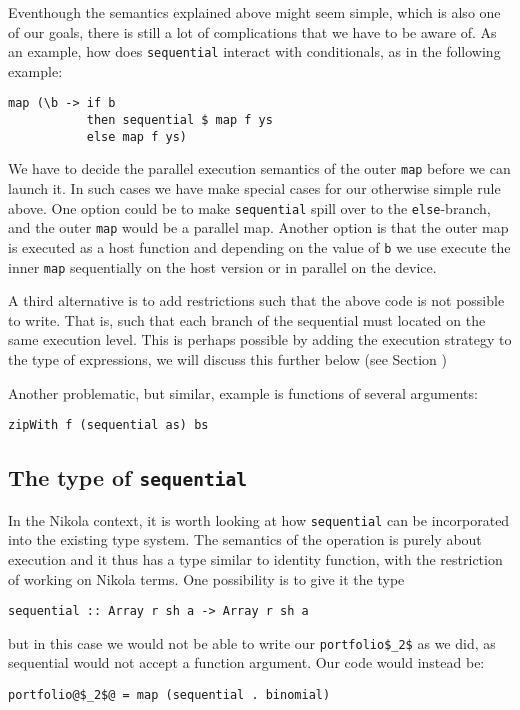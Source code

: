 Eventhough the semantics explained above might seem simple, which is
also one of our goals, there is still a lot of complications that we
have to be aware of. As an example, how does \lstinline{sequential}
interact with conditionals, as in the following example:
\begin{lstlisting}
map (\b -> if b 
           then sequential $ map f ys 
           else map f ys)
\end{lstlisting}
We have to decide the parallel execution semantics of the outer
\lstinline{map} before we can launch it. In such cases we have make
special cases for our otherwise simple rule above. One option could be
to make \lstinline{sequential} spill over to the
\lstinline{else}-branch, and the outer \lstinline{map} would be a
parallel map. Another option is that the outer map is executed as a
host function and depending on the value of \lstinline{b} we use
execute the inner \lstinline{map} sequentially on the host version or
in parallel on the device.

A third alternative is to add restrictions such that the above code is
not possible to write. That is, such that each branch of the
sequential must located on the same execution level. This is perhaps
possible by adding the execution strategy to the type of expressions,
we will discuss this further below (see Section )

Another problematic, but similar, example is functions of several arguments:
\begin{lstlisting}
zipWith f (sequential as) bs
\end{lstlisting}

\subsection{The type of \texttt{sequential}}
In the Nikola context, it is worth looking at how
\lstinline{sequential} can be incorporated into the existing type
system. The semantics of the operation is purely about execution and
it thus has a type similar to identity function, with the restriction
of working on Nikola terms. One possibility is to give it the type
\begin{lstlisting}
sequential :: Array r sh a -> Array r sh a
\end{lstlisting}
but in this case we would not be able to write our
\lstinline[mathescape]{portfolio$_2$} as we did, as sequential would
not accept a function argument. Our code would instead be:
\begin{lstlisting}
portfolio@$_2$@ = map (sequential . binomial)
\end{lstlisting}

